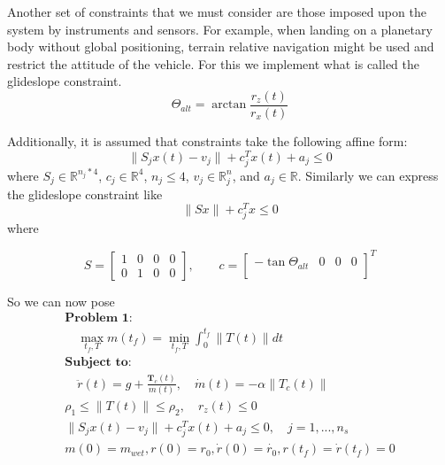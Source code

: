 \documentclass[journal]{new-aiaa}
\begin{document}
\begin{singlespace}
Another set of constraints that we must consider are those imposed upon the system by instruments and sensors. For example, when landing on a planetary body without global positioning, terrain relative navigation might be used and restrict the attitude of the vehicle. For this we implement what is called the glideslope constraint.
\begin{equation}
\Theta_{alt} = \arctan{\frac{r_z(t)}{r_x(t)}}
\end{equation}

Additionally, it is assumed that constraints take the following affine form:
\begin{equation}
\|S_jx(t)-v_j\| + c_j^Tx(t)+a_j\leq 0
\end{equation}
where $S_j \in \mathbb{R}^{n_j*4} $, $c_j \in \mathbb{R}^4$, $n_j\leq 4$, $v_j \in \mathbb{R}^n_j$, and $a_j \in \mathbb{R}$. Similarly we can express the glideslope constraint like
\begin{equation}
\|Sx\| + c_j^Tx\leq 0
\end{equation}
where

\[
S = 
\begin{bmatrix}
1 &0 &0 &0 \\
0 &1 &0 &0
\end{bmatrix}, \qquad
c = 
\begin{bmatrix}
-\tan{\Theta_{alt}} &0 &0 &0 \\
\end{bmatrix}^T
\]

So we can now pose
\begin{align*}
 \textbf{Problem 1:} \\
 \quad \max_{t_f, T} m(t_f) = \min_{t_f, T}\int^{t_f}_0 \|T(t)\| dt \\
 \textbf{Subject to:} \\
 \quad \ddot{r}(t)= g + \frac{\boldsymbol T_c (t)}{m(t)}, \quad \dot{m}(t)=-\alpha \|T_c (t)\| \\
 \rho_1 \leq \lVert T (t) \rVert \leq \rho_2, \quad  r_z(t) \leq 0 \\
 \|S_jx(t)-v_j\| + c_j^Tx(t)+a_j\leq 0, \quad j = 1,...,n_s \\
 m(0) = m_{wet}, r(0) = r_0, \dot{r}(0) = \dot{r_0}, r(t_f) =\dot{r}(t_f) = 0
\end{align*}



\end{singlespace}
\end{document}

